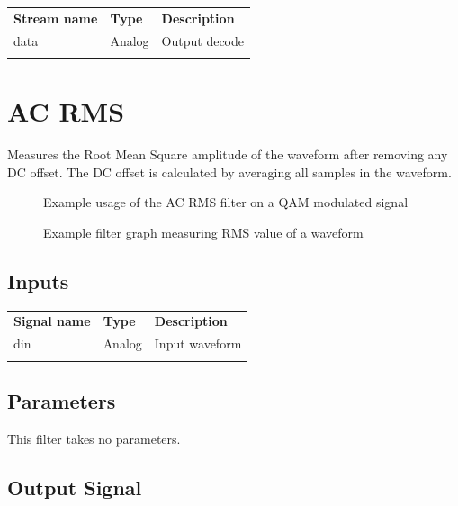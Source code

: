 \begin{tabularx}{16cm}{llX}
\thickhline
\textbf{Stream name} & \textbf{Type} & \textbf{Description} \\
\thickhline
data & Analog & Output decode \\
\thickhline
\end{tabularx}

\pagebreak
\section{AC RMS}
\label{filter:acrms}

Measures the Root Mean Square amplitude of the waveform after removing any DC offset. The DC offset is calculated by
averaging all samples in the waveform.

\begin{figure}[h]
\centering
{}
\caption{Example usage of the AC RMS filter on a QAM modulated signal}
\label{filter_acrms}
\end{figure}

\begin{figure}[h]
\centering
{}
\caption{Example filter graph measuring RMS value of a waveform}
\label{filter_graph_acrms}
\end{figure}
\FloatBarrier

\subsection{Inputs}

\begin{tabularx}{16cm}{llX}
\thickhline
\textbf{Signal name} & \textbf{Type} & \textbf{Description} \\
\thickhline
din & Analog & Input waveform \\
\thickhline
\end{tabularx}

\subsection{Parameters}

This filter takes no parameters.

\subsection{Output Signal}

